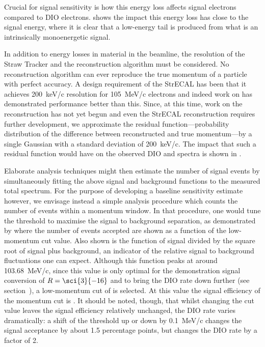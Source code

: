 Crucial for signal sensitivity is how this energy loss affects signal electrons compared to \ac{DIO} electrons.
 shows the impact this energy loss has close to the signal energy, where it is clear that a low-energy tail is produced from what is an intrinsically monoenergetic signal.

In addition to energy losses in material in the beamline, the resolution of the Straw Tracker and the reconstruction algorithm must be considered.
No reconstruction algorithm can ever reproduce the true momentum of a particle with perfect accuracy.
A design requirement of the StrECAL has been that it achieves 200~keV/c resolution for 105~MeV/c electrons and indeed work on \phaseI has demonstrated performance better than this.
Since, at this time, work on the \phaseII reconstruction has not yet begun and even the \phaseI StrECAL reconstruction requires further development, we approximate the residual function---probability distribution of the difference between reconstructed and true momentum---by a single Gaussian with a standard deviation of 200~keV/c.
The impact that such a residual function would have on the observed \ac{DIO} and \mueconv spectra is shown in .

\FigSensMomIntegral
Elaborate analysis techniques might then estimate the number of signal events by simultaneously fitting the above signal and background functions to the measured total spectrum.
For the purpose of developing a baseline sensitivity estimate however, we envisage instead a simple analysis procedure which counts the number of events within a momentum window.
In that procedure, one would tune the threshold to maximise the signal to background separation, as demonstrated by  where the number of events accepted are shown as a function of the low-momentum cut value.
Also shown is the function of signal divided by the square root of signal plus background, an indicator of the relative signal to background fluctuations one can expect.
Although this function peaks at around 103.68~MeV/c, since this value is only optimal for the demonstration signal conversion of $R=\sci{3}{-16}$ and to bring the \ac{DIO} rate down further (see section~), a low-momentum cut of \VarMomThreshold is selected.
At this value the signal efficiency of the momentum cut is \VarAcceptanceMom.
It should be noted, though, that whilst changing the cut value leaves the signal efficiency relatively unchanged, the DIO rate varies dramatically: a shift of the threshold up or down by 0.1~MeV/c changes the signal acceptance by about 1.5 percentage points, but changes the DIO rate by a factor of 2.

